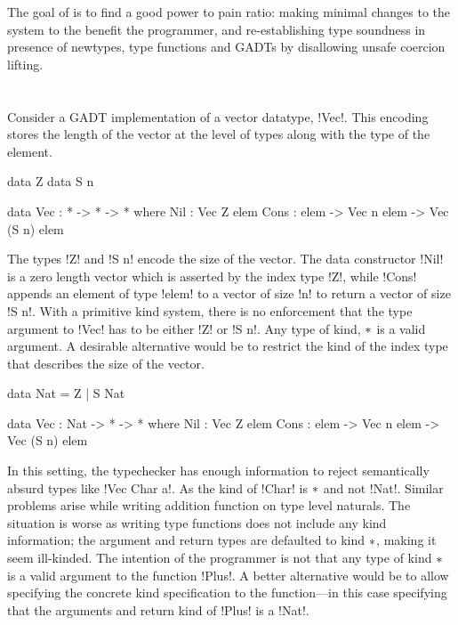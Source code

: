\documentclass[screen,nonacm,manuscript,review]{acmart} %
\begin{document}
The goal of \SFR is to find a good power to pain ratio: making
minimal changes to the system to the benefit the programmer, and
re-establishing type soundness in presence of newtypes, type functions
and GADTs by disallowing unsafe coercion lifting.

\section{\SFP}\label{sec:sfp} %
Consider a GADT implementation of a vector datatype, !Vec!.
This encoding stores the length of the vector at the level of types
along with the type of the element.

\begin{minipage}[ht]{0.4\linewidth}
\begin{code}
        data Z
        data S n
\end{code}
\end{minipage}%
\begin{minipage}[ht]{0.4\linewidth}
\begin{code}
    data Vec : * -> * -> * where
       Nil : Vec Z elem
       Cons : elem -> Vec n elem -> Vec (S n) elem
\end{code}
\end{minipage}

The types !Z! and !S n! encode the size of the vector. The data
constructor !Nil! is a zero length vector which is asserted by the
index type !Z!, while !Cons! appends an element of type !elem! to a
vector of size !n! to return a vector of size !S n!. With a primitive
kind system, there is no enforcement that the type argument to !Vec!
has to be either !Z! or !S n!. Any type of kind, $\ast$ is a valid
argument. A desirable alternative would be to restrict the kind
of the index type that describes the size of the vector.

\begin{minipage}[ht]{0.4\linewidth}
\begin{code}
         data Nat = Z | S Nat
\end{code}
\end{minipage}%
\begin{minipage}[ht]{0.4\linewidth}
\begin{code}
     data Vec : Nat -> * -> * where
        Nil : Vec Z elem
        Cons : elem -> Vec n elem -> Vec (S n) elem
\end{code}
\end{minipage}

In this setting, the typechecker has enough information to reject
semantically absurd types like !Vec Char a!. As the kind of !Char! is
$\ast$ and not !Nat!. Similar problems arise while writing addition function on type level
naturals. The situation is worse as writing type functions does not
include any kind information; the argument and return types are
defaulted to kind $\ast$, making it seem ill-kinded. The intention of
the programmer is not that any type of kind $\ast$ is a valid
argument to the function !Plus!. A better alternative would be to
allow specifying the concrete kind specification to the function---in
this case specifying that the arguments and return kind of !Plus! is a
!Nat!.
\end{document}
